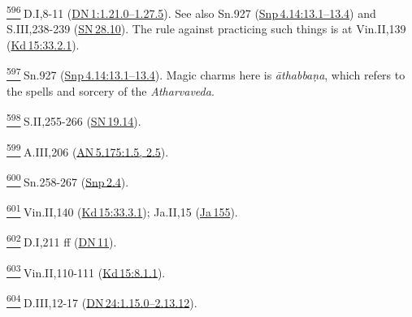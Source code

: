 \label{footprints_split_025.html_fn596}
\hyperref[footprints_split_015.htmlux5cux23fnref596]{\textsuperscript{596}} D.I,8-11
(\href{https://suttacentral.net/dn1/en/sujato\#1.21.0}{DN\,1:1.21.0--1.27.5}).
See also Sn.927
(\href{https://suttacentral.net/snp4.14/en/sujato\#13.1}{Snp\,4.14:13.1--13.4})
and S.III,238-239
(\href{https://suttacentral.net/sn28.10/en/sujato}{SN\,28.10}). The rule
against practicing such things is at Vin.II,139
(\href{https://suttacentral.net/pli-tv-kd15/en/brahmali\#33.2.1}{Kd\,15:33.2.1}).

\label{footprints_split_025.html_fn597}
\hyperref[footprints_split_015.htmlux5cux23fnref597]{\textsuperscript{597}} Sn.927
(\href{https://suttacentral.net/snp4.14/en/sujato\#13.1}{Snp\,4.14:13.1--13.4}).
Magic charms here is \emph{āthabbaṇa}, which refers to the spells and
sorcery of the \emph{Atharvaveda}.

\label{footprints_split_025.html_fn598}
\hyperref[footprints_split_015.htmlux5cux23fnref598]{\textsuperscript{598}} S.II,255-266
(\href{https://suttacentral.net/sn19.14/en/sujato}{SN\,19.14}).

\label{footprints_split_025.html_fn599}
\hyperref[footprints_split_015.htmlux5cux23fnref599]{\textsuperscript{599}} A.III,206
(\href{https://suttacentral.net/an5.175/en/sujato\#1.5}{AN\,5.175:1.5,
2.5}).

\label{footprints_split_025.html_fn600}
\hyperref[footprints_split_015.htmlux5cux23fnref600]{\textsuperscript{600}} Sn.258-267
(\href{https://suttacentral.net/snp2.4/en/sujato}{Snp\,2.4}).

\label{footprints_split_025.html_fn601}
\hyperref[footprints_split_015.htmlux5cux23fnref601]{\textsuperscript{601}} Vin.II,140
(\href{https://suttacentral.net/pli-tv-kd15/en/brahmali\#33.3.1}{Kd\,15:33.3.1});
Ja.II,15 (\href{https://suttacentral.net/ja155}{Ja\,155}).

\label{footprints_split_025.html_fn602}
\hyperref[footprints_split_015.htmlux5cux23fnref602]{\textsuperscript{602}} D.I,211
ff (\href{https://suttacentral.net/dn11/en/sujato}{DN\,11}).

\label{footprints_split_025.html_fn603}
\hyperref[footprints_split_015.htmlux5cux23fnref603]{\textsuperscript{603}} Vin.II,110-111
(\href{https://suttacentral.net/pli-tv-kd15/en/brahmali?reference=main\#8.1.1}{Kd\,15:8.1.1}).

\label{footprints_split_025.html_fn604}
\hyperref[footprints_split_015.htmlux5cux23fnref604]{\textsuperscript{604}} D.III,12-17
(\href{https://suttacentral.net/dn24/en/sujato\#1.15.0}{DN\,24:1.15.0--2.13.12}).

